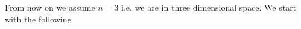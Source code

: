 \documentclass[12pt,a4paper]{article}
\newtheorem{proposition}{Proposition}
\theoremstyle{definition}
\newcommand{\real}{\mathbb{R}}
\begin{document}

From now on we assume $n=3$ i.e. we are in three dimensional space.
We start with the following
\end{document}
